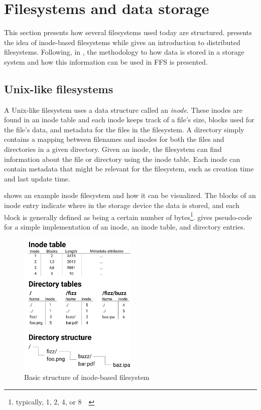 \section{Filesystems and data storage}
\label{sec:fs_data_store}
This section presents how several filesystems used today are structured.  presents the idea of \mbox{inode-based} filesystems while  gives an introduction to distributed filesystems. Following, in , the methodology to how data is stored in a storage system and how this information can be used in \gls{FFS} is presented.

\subsection{\mbox{Unix-like} filesystems}
\label{sec:inodeFSintroduction}
A \mbox{Unix-like} filesystem uses a data structure called an \textit{inode}. These inodes are found in an inode table and each inode keeps track of a file's size, blocks used for the file's data, and metadata for the files in the filesystem. A directory simply contains a mapping between filenames and inodes for both the files and directories in a given directory. Given an inode, the filesystem can find information about the file or directory using the inode table. Each inode can contain metadata that might be relevant for the filesystem, such as creation time and last update time. 

 shows an example inode filesystem and how it can be visualized. The blocks of an inode entry indicate where in the storage device the data is stored, and each block is generally defined as being a certain number of bytes\footnote{typically, 1, 2, 4, or \SI{8}{\kibi\byte}}.  gives pseudo-code for a simple implementation of an inode, an inode table, and directory entries. 

\begin{figure}[!ht]
	\begin{center}
	  \includegraphics[width=0.5\textwidth]{figures.nosync/inode_diagram.png}
	\end{center}
	\caption{Basic structure of \mbox{inode-based} filesystem}
	\label{fig:inode_diag}
\end{figure}

